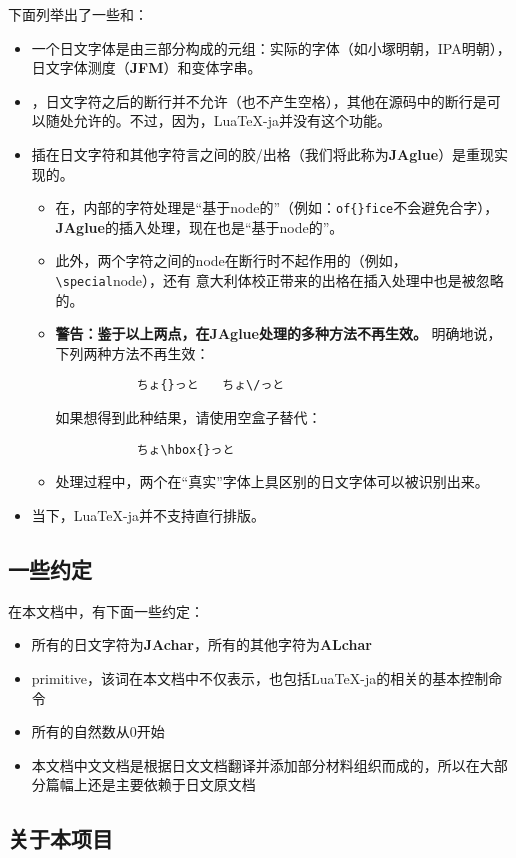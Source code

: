 \documentclass{ltjarticle}
\def\LuaTeX{Lua\TeX}
\def\pTeX{p\TeX}
\begin{document}
下面列举出了一些和：
\begin{itemize}
\item 一个日文字体是由三部分构成的元组：实际的字体（如小塚明朝，IPA明朝），日文字体测度（\textbf{JFM}）和变体字串。
\item {}，日文字符之后的断行并不允许（也不产生空格），其他在源码中的断行是可以随处允许的。不过，因为，\LuaTeX-ja并没有这个功能。
\item 插在日文字符和其他字符言之间的胶/出格（我们将此称为\textbf{JAglue}）是重现实现的。
	\begin{itemize}
	\item 在，内部的字符处理是“基于node的”（例如：\verb!of{}fice!不会避免合字），
		\textbf{JAglue}的插入处理，现在也是“基于node的”。
	\item 此外，两个字符之间的node在断行时不起作用的（例如，\verb!\special!node），还有
		意大利体校正带来的出格在插入处理中也是被忽略的。
	\item \textbf{警告：鉴于以上两点，在\textbf{JAglue}处理的多种方法不再生效。}
		明确地说，下列两种方法不再生效：
		\begin{verbatim}
		　　ちょ{}っと　　ちょ\/っと
		\end{verbatim}
		如果想得到此种结果，请使用空盒子替代：
		\begin{verbatim}
		　　ちょ\hbox{}っと
		\end{verbatim}
	\item 处理过程中，两个在“真实”字体上具区别的日文字体可以被识别出来。
	\end{itemize}
\item 当下，\LuaTeX-ja并不支持直行排版。
\end{itemize}
\subsection{一些约定} 
在本文档中，有下面一些约定：
\begin{itemize}
\item 所有的日文字符为\textbf{JAchar}，所有的其他字符为\textbf{ALchar}
\item primitive，该词在本文档中不仅表示，也包括\LuaTeX-ja的相关的基本控制命令
\item 所有的自然数从0开始
\item 本文档中文文档是根据日文文档翻译并添加部分材料组织而成的，所以在大部分篇幅上还是主要依赖于日文原文档
\end{itemize}
\subsection{关于本项目}
\end{document}
